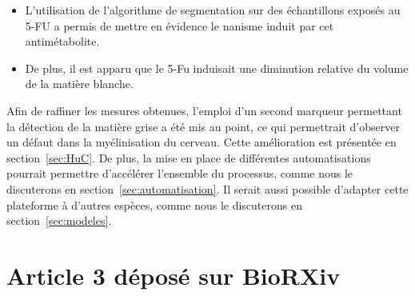 \documentclass[\main/main.tex]{subfiles}
\begin{document}
\begin{itemize}
    \item
    L'utilisation de l'algorithme de segmentation sur des échantillons exposés au 5-FU
    a permis de mettre en évidence le nanisme induit par cet antimétabolite. 
    
    \item
    De plus, il est apparu que le 5-Fu induisait une diminution relative du volume de la matière blanche.
    
\end{itemize}

Afin de raffiner les mesures obtenues, l'emploi d'un second marqueur permettant la détection de la matière grise a été mis au point, ce qui permettrait d'observer un défaut dans la myélinisation du cerveau. Cette amélioration est présentée en section~\ref{sec:HuC}.
%
De plus, la mise en place de différentes automatisations pourrait permettre d'accélérer l'ensemble du processus, comme nous le discuterons en section~\ref{sec:automatisation}.
%
Il serait aussi possible d'adapter cette plateforme à d'autres espèces, comme nous le discuterons en section~\ref{sec:modeles}.

\section{Article 3 déposé sur BioRXiv}
\end{document}

